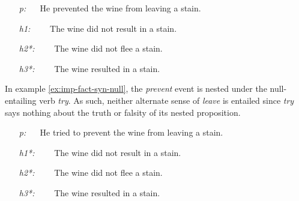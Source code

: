 \begin{covex}\label{ex:imp-fact-syn}
\begin{itemize} \itemsep -1pt
  \item[{\it p:}]~~    He prevented the wine from leaving a stain.
  \item[{\it h1:}]~~~~The wine did not result in a stain.
  \item[{\it h2*:}]~~~~The wine did not flee a stain.
  \item[{\it h3*:}]~~~~The wine resulted in a stain.
\end{itemize}
\end{covex}

In example \eqref{ex:imp-fact-syn-null}, the {\it prevent} event is nested under
the null-entailing verb {\it try}.  As such, neither alternate sense of {\it
leave} is entailed since {\it try} says nothing about the truth or falsity of
its nested proposition.

\begin{covex}\label{ex:imp-fact-syn-null}
\begin{itemize} \itemsep -1pt
  \item[{\it p:}]~~    He tried to prevent the wine from leaving a stain.
  \item[{\it h1*:}]~~~~The wine did not result in a stain.
  \item[{\it h2*:}]~~~~The wine did not flee a stain.
  \item[{\it h3*:}]~~~~The wine resulted in a stain.
\end{itemize}
\end{covex}
  

% 

